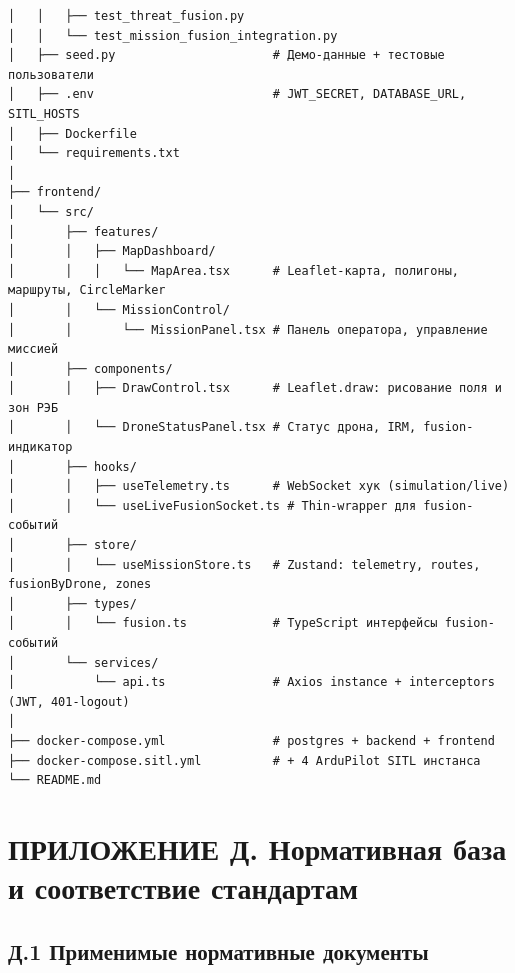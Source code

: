 \documentclass[14pt,a4paper]{extarticle}
\begin{document}
\begin{verbatim}
│   │   ├── test_threat_fusion.py
│   │   └── test_mission_fusion_integration.py
│   ├── seed.py                      # Демо-данные + тестовые пользователи
│   ├── .env                         # JWT_SECRET, DATABASE_URL, SITL_HOSTS
│   ├── Dockerfile
│   └── requirements.txt
│
├── frontend/
│   └── src/
│       ├── features/
│       │   ├── MapDashboard/
│       │   │   └── MapArea.tsx      # Leaflet-карта, полигоны, маршруты, CircleMarker
│       │   └── MissionControl/
│       │       └── MissionPanel.tsx # Панель оператора, управление миссией
│       ├── components/
│       │   ├── DrawControl.tsx      # Leaflet.draw: рисование поля и зон РЭБ
│       │   └── DroneStatusPanel.tsx # Статус дрона, IRM, fusion-индикатор
│       ├── hooks/
│       │   ├── useTelemetry.ts      # WebSocket хук (simulation/live)
│       │   └── useLiveFusionSocket.ts # Thin-wrapper для fusion-событий 
│       ├── store/
│       │   └── useMissionStore.ts   # Zustand: telemetry, routes, fusionByDrone, zones
│       ├── types/
│       │   └── fusion.ts            # TypeScript интерфейсы fusion-событий
│       └── services/
│           └── api.ts               # Axios instance + interceptors (JWT, 401-logout)
│
├── docker-compose.yml               # postgres + backend + frontend
├── docker-compose.sitl.yml          # + 4 ArduPilot SITL инстанса
└── README.md
\end{verbatim}


\hypertarget{ux43fux440ux438ux43bux43eux436ux435ux43dux438ux435-ux434.-ux43dux43eux440ux43cux430ux442ux438ux432ux43dux430ux44f-ux431ux430ux437ux430-ux438-ux441ux43eux43eux442ux432ux435ux442ux441ux442ux432ux438ux435-ux441ux442ux430ux43dux434ux430ux440ux442ux430ux43c}{%
\section{ПРИЛОЖЕНИЕ Д. Нормативная база и соответствие стандартам}\label{ux43fux440ux438ux43bux43eux436ux435ux43dux438ux435-ux434.-ux43dux43eux440ux43cux430ux442ux438ux432ux43dux430ux44f-ux431ux430ux437ux430-ux438-ux441ux43eux43eux442ux432ux435ux442ux441ux442ux432ux438ux435-ux441ux442ux430ux43dux434ux430ux440ux442ux430ux43c}}

\hypertarget{ux434.1-ux43fux440ux438ux43cux435ux43dux438ux43cux44bux435-ux43dux43eux440ux43cux430ux442ux438ux432ux43dux44bux435-ux434ux43eux43aux443ux43cux435ux43dux442ux44b}{%
\subsection{Д.1 Применимые нормативные документы}\label{ux434.1-ux43fux440ux438ux43cux435ux43dux438ux43cux44bux435-ux43dux43eux440ux43cux430ux442ux438ux432ux43dux44bux435-ux434ux43eux43aux443ux43cux435ux43dux442ux44b}}
\end{document}
